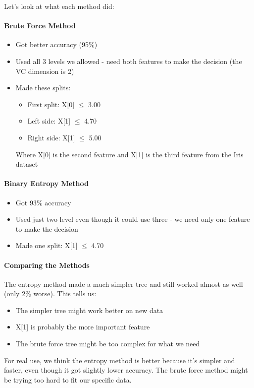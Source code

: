 \documentclass{article}
\begin{document}
Let's look at what each method did:

\paragraph{Brute Force Method}
\begin{itemize}
    \item Got better accuracy (95\%)
    \item Used all 3 levels we allowed - need both features to make the decision (the VC dimension is 2)
    \item Made these splits:
        \begin{itemize}
            \item First split: X[0] $\leq$ 3.00
            \item Left side: X[1] $\leq$ 4.70
            \item Right side: X[1] $\leq$ 5.00
        \end{itemize}
        Where X[0] is the second feature and X[1] is the third feature from the Iris dataset
\end{itemize}

\paragraph{Binary Entropy Method}
\begin{itemize}
    \item Got 93\% accuracy
    \item Used just two level even though it could use three - we need only one feature to make the decision
    \item Made one split: X[1] $\leq$ 4.70
\end{itemize}

\paragraph{Comparing the Methods}
The entropy method made a much simpler tree and still worked almost as well (only 2\% worse). This tells us:
\begin{itemize}
    \item The simpler tree might work better on new data
    \item X[1] is probably the more important feature
    \item The brute force tree might be too complex for what we need
\end{itemize}

\noindent For real use, we think the entropy method is better because it's simpler and faster, even though it got slightly lower accuracy. The brute force method might be trying too hard to fit our specific data.
\end{document}
